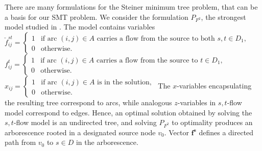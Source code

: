 There are many formulations for the Steiner minimum tree problem, that can be a basis for our SMT problem. We consider the formulation $P_{F^2}$, the strongest model studied in \cite{Polzin}. The model contains variables
\newline\newline  
  $\check{f}^{st}_{ij}=
	\begin{cases}
    1 & \text{if arc $(i,j) \in A$ carries a flow from the source to both $s,t\in D_1$},\\
    0 & \text{otherwise}.
  \end{cases}$
\newline\newline  
  $f^{t}_{ij}=
	\begin{cases}
    1 & \text{if arc $(i,j) \in A$ carries a flow from the source to $t\in D_1$},\\
    0 & \text{otherwise}.
  \end{cases}$  
\newline\newline  
  $x_{ij}=
	\begin{cases}
    1 & \text{if arc $(i,j) \in A$ is in the solution},\\
    0 & \text{otherwise}.
  \end{cases}$  
\newline
\newline   
The $x$-variables encapsulating the resulting tree correspond to arcs, while analogous $z$-variables in $s,t$-flow model correspond to edges. Hence, an optimal solution obtained by solving the $s,t$-flow model is an undirected tree, and solving $P_{F^2}$ to optimality produces an arborescence rooted in a designated source node $v_0$. Vector $\mathbf{f^s}$ defines a directed path from $v_0$ to $s\in D$ in the arborescence.


